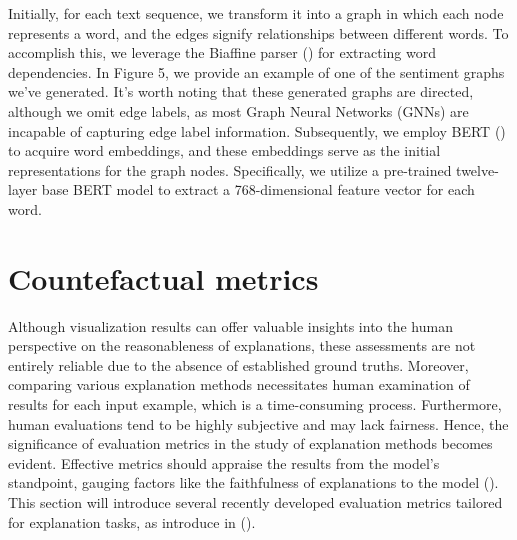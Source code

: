 \documentclass[binding=0.6cm]{sapthesis}
\newcommand{\mycite}[1]{(\cite{#1})}
\begin{document}
Initially, for each text sequence, we transform it into a graph in which each node represents a word, and the edges signify relationships between different words. To accomplish this, we leverage the Biaffine parser \mycite{gardner2018-allennlp} for extracting word dependencies. In Figure 5, we provide an example of one of the sentiment graphs we've generated. It's worth noting that these generated graphs are directed, although we omit edge labels, as most Graph Neural Networks (GNNs) are incapable of capturing edge label information. Subsequently, we employ BERT \mycite{devlin2018-bert} to acquire word embeddings, and these embeddings serve as the initial representations for the graph nodes. Specifically, we utilize a pre-trained twelve-layer base BERT model to extract a 768-dimensional feature vector for each word.

\newpage
\section{Countefactual metrics}
\label{sec:expRes.cf-metrics}
Although visualization results can offer valuable insights into the human perspective on the reasonableness of explanations, these assessments are not entirely reliable due to the absence of established ground truths. Moreover, comparing various explanation methods necessitates human examination of results for each input example, which is a time-consuming process. Furthermore, human evaluations tend to be highly subjective and may lack fairness.
Hence, the significance of evaluation metrics in the study of explanation methods becomes evident. Effective metrics should appraise the results from the model's standpoint, gauging factors like the faithfulness of explanations to the model \mycite{jacovi2020-faithfully,wiegreffe2019-attention-notnot}. This section will introduce several recently developed evaluation metrics tailored for explanation tasks, as introduce in \mycite{arrieta2020-taxo-xai}.
\end{document}
